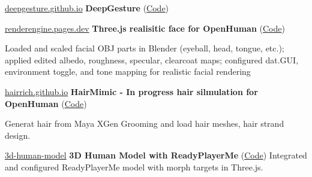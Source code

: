 


\begin{twocolentry}{\href{https://deepgesture.github.io}{deepgesture.github.io}}
	\textbf{DeepGesture} (\href{https://github.com/DeepGesture/DeepGesture}{Code})
\end{twocolentry}


\begin{twocolentry}{\href{https://renderengine.pages.dev}{renderengine.pages.dev}}
	\textbf{Three.js realisitic face for OpenHuman} (\href{https://github.com/openhuman-ai/renderengine}{Code})
	\begin{highlights}
		\item Loaded and scaled facial OBJ parts in Blender (eyeball, head, tongue, etc.); applied edited albedo, roughness, specular, clearcoat maps; configured dat.GUI, environment toggle, and tone mapping for realistic facial rendering
	\end{highlights}
\end{twocolentry}

\begin{twocolentry}{\href{https://hairrich.github.io}{hairrich.github.io}}
	\textbf{HairMimic - In progress hair silmulation for OpenHuman} (\href{https://github.com/hairmimic/hairmimic.github.io}{Code})
	\begin{highlights}
			\item Generat hair from Maya XGen Grooming and load hair meshes, hair strand design.
	\end{highlights}
\end{twocolentry}


\begin{twocolentry}{\href{https://hmthanh.github.io/3d-human-model}{3d-human-model}}
	\textbf{3D Human Model with ReadyPlayerMe} (\href{https://github.com/hmthanh/3d-human-model}{Code})
	Integrated and configured ReadyPlayerMe model with morph targets in Three.js.
\end{twocolentry}

